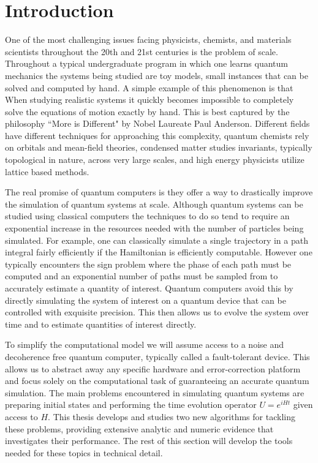 \chapter{Introduction}
One of the most challenging issues facing physicists, chemists, and materials scientists throughout the 20th and 21st centuries is the problem of scale. Throughout a typical undergraduate program in which one learns quantum mechanics the systems being studied are toy models, small instances that can be solved and computed by hand. A simple example of this phenomenon is that When studying realistic systems it quickly becomes impossible to completely solve the equations of motion exactly by hand. This is best captured by the philosophy ``More is Different" by Nobel Laureate Paul Anderson. Different fields have different techniques for approaching this complexity, quantum chemists rely on orbitals and mean-field theories, condensed matter studies invariants, typically topological in nature, across very large scales, and high energy physicists utilize lattice based methods. 

The real promise of quantum computers is they offer a way to drastically improve the simulation of quantum systems at scale. Although quantum systems can be studied using classical computers the techniques to do so tend to require an exponential increase in the resources needed with the number of particles being simulated. For example, one can classically simulate a single trajectory in a path integral fairly efficiently if the Hamiltonian is efficiently computable. However one typically encounters the sign problem where the phase of each path must be computed and an exponential number of paths must be sampled from to accurately estimate a quantity of interest. Quantum computers avoid this by directly simulating the system of interest on a quantum device that can be controlled with exquisite precision. This then allows us to evolve the system over time and to estimate quantities of interest directly. 

To simplify the computational model we will assume access to a noise and decoherence free quantum computer, typically called a fault-tolerant device. This allows us to abstract away any specific hardware and error-correction platform and focus solely on the computational task of guaranteeing an accurate quantum simulation. The main problems encountered in simulating quantum systems are preparing initial states and performing the time evolution operator $U = e^{i H t}$ given access to $H$. This thesis develops and studies two new algorithms for tackling these problems, providing extensive analytic and numeric evidence that investigates their performance. The rest of this section will develop the tools needed for these topics in technical detail. 